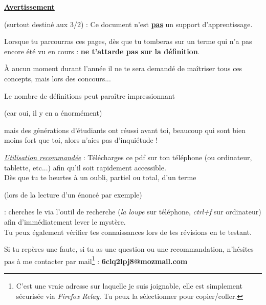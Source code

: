 \vspace{2cm}

\noindent\begin{Large} \textbf{\underline{Avertissement}}\end{Large} (surtout destiné aux 3/2) : Ce document n'est \underline{\textbf{pas}} un support d'apprentissage.

\vspace{3cm}

Lorsque tu parcourras ces pages, dès que tu tomberas sur un terme qui n'a pas encore été vu en cours : \textbf{ne t'attarde pas sur la définition}. 

\vspace{0.5cm}

À aucun moment durant l'année il ne te sera demandé de maîtriser tous ces concepts, mais lors des concours...

\vspace{0.5cm}

Le nombre de définitions peut paraître impressionnant \begin{small}(car oui, il y en a énormément)\end{small} mais des générations d'étudiants ont réussi avant toi, beaucoup qui sont bien moins fort que toi, alors n'aies pas d'inquiétude !

\vspace{3cm}

\underline{\emph{Utilisation recommandée}} : Télécharges ce pdf sur ton téléphone (ou ordinateur, tablette, etc...) afin qu'il soit rapidement accessible.\\
Dès que tu te heurtes à un oubli, partiel ou total, d'un terme \begin{small}(lors de la lecture d'un énoncé par exemple)\end{small} : cherches le via l'outil de recherche (\emph{la loupe} sur téléphone, \emph{ctrl+f} sur ordinateur) afin d'immédiatement lever le mystère.\vspace{0.2cm}\\
Tu peux également vérifier tes connaissances lors de tes révisions en te \guillemotleft testant\guillemotright.

\vspace{6cm}

\begin{center}\noindent Si tu repères une faute, si tu as une question ou une recommandation, n'hésites pas à me contacter par mail\footnote{C'est une vraie adresse sur laquelle je suis joignable, elle est simplement sécurisée via \emph{Firefox Relay}. Tu peux la sélectionner pour copier/coller.} :\hspace{0.3cm} \textbf{6clq2lpj8@mozmail.com} \end{center}

\vspace{1cm}